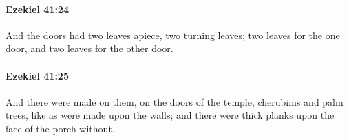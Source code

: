 		\paragraph{Ezekiel 41:24} %
			\label{EZEKIEL-41-24}

			And the doors had two leaves apiece, two turning leaves; two leaves for the one door, and two leaves for the other door.


		\paragraph{Ezekiel 41:25} %
			\label{EZEKIEL-41-25}

			And there were made on them, on the doors of the temple, cherubims and palm trees, like as were made upon the walls; and there were thick planks upon the face of the porch without.


